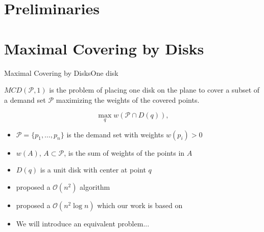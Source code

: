 \documentclass{beamer}
\newcommand{\R}{\mathbb{R}}
\newcommand{\Pp}{\mathscr{P}}
\newcommand{\bigO}{\mathscr{O}}
\begin{document}
\section{Preliminaries}

	
%			






\section{Maximal Covering by Disks}
\begin{frame}{Maximal Covering by Disks}{One disk}
	
	$MCD(\Pp, 1)$ is the problem of placing one disk on the plane to cover a subset of a demand set $\Pp$ maximizing the weights of the covered points.
	
	\begin{equation*}\label{eq:max_one_disk}
		\max_q w(\Pp \cap D(q)),
	\end{equation*}
	
	\begin{itemize}
		\item $\Pp=\{p_1,\dots,p_n\}$ is the demand set with weights $w(p_i)>0$
		\item $w(A)$, $A\subset \Pp$, is the sum of weights of the points in $A$
		\item $D(q)$ is a unit disk with center at point $q$
		\item \autocite{chazelle:1986} proposed a $\bigO(n^2)$ algorithm
		\item \autocite{drezner} proposed a $\bigO(n^2\log{n})$ which our work is based on
		\item We will introduce an equivalent problem...
	\end{itemize}
\end{frame}
\end{document}
